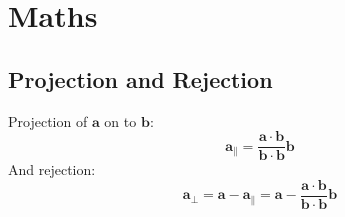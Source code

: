 \section{Maths}
\subsection{Projection and Rejection}
Projection of $\mathbf{a}$ on to $\mathbf{b}$:
\begin{equation}
    \label{project}
    \mathbf{a}_\parallel = \frac{\mathbf{a}\cdot\mathbf{b}}{\mathbf{b}\cdot\mathbf{b}}\mathbf{b}
\end{equation}
And rejection:
\begin{equation}
    \label{reject}
    \mathbf{a}_\perp = \mathbf{a}-\mathbf{a}_\parallel = \mathbf{a}-\frac{\mathbf{a}\cdot\mathbf{b}}{\mathbf{b}\cdot\mathbf{b}}\mathbf{b}
\end{equation}


